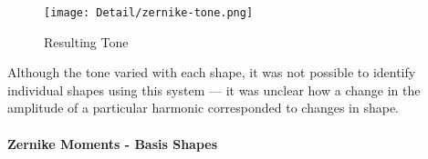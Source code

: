 \begin{figure}[H]
    \centering
    \texttt{[image: Detail/zernike-tone.png]}
    \caption{Resulting Tone}
\end{figure}

Although the tone varied with each shape, it was not possible to identify individual shapes using this system --- it was unclear how a change in the amplitude of a particular harmonic corresponded to changes in shape.

\paragraph{Zernike Moments - Basis Shapes}

